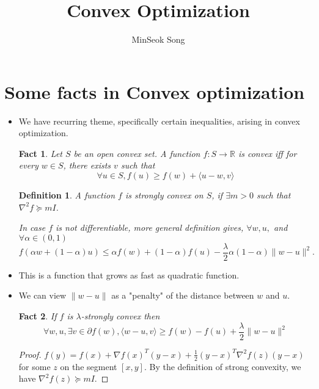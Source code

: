 \documentclass[11pt,reqno]{amsart}
\title{Convex Optimization}
\author{MinSeok Song}
\date{}
\newtheorem{fact}{Fact}
\newtheorem{definition}{Definition}
\theoremstyle{remark}
\begin{document}
\maketitle
\section*{Some facts in Convex optimization}
\begin{itemize}
\item We have recurring theme, specifically certain inequalities, arising in convex optimization.
\begin{fact}
Let $S$ be an open convex set. A function $f:S\to\mathbb{R}$ is convex iff for every $w\in S$, 
there exists $v$ such that 
\[
\forall u\in S, f(u)\geq f(w)+\langle u-w,v\rangle
\]
\end{fact}
\begin{definition}
A function $f$ is strongly convex on $S$, if $\exists m>0$ such that $\nabla^2 f\succeq mI$.

In case $f$ is not differentiable, more general definition gives, $\forall w,u,$ and $\forall \alpha\in (0,1)$
\[
f(\alpha w+(1-\alpha)u)\leq \alpha f(w)+(1-\alpha)f(u)-\frac \lambda 2 \alpha(1-\alpha)\lVert w-u\rVert^2.
\]
\end{definition}
\item This is a function that grows as fast as quadratic function.
\item We can view $\lVert w-u\rVert$ as a "penalty" of the distance between $w$ and $u$.
\begin{fact}
If $f$ is $\lambda$-strongly convex then 
\[
\forall w,u, \exists v\in \partial f(w), \langle w-u,v\rangle\geq f(w)-f(u)+\frac \lambda 2\lVert w-u\rVert^2
\]
\end{fact}
\begin{proof}
$f(y)= f(x)+\nabla f(x)^T (y-x)+\frac 12(y-x)^T\nabla^2 f(z)(y-x)$ for some
 $z$ on the segment $[x,y]$. By the definition of strong convexity, we have $\nabla^2 f(z)\succeq mI$.
\end{proof}

\end{itemize}
\end{document}
